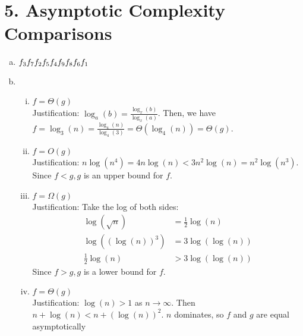 \documentclass[a4paper]{article}
\newcommand{\f}[1]{\text{#1}}
\newcommand{\<}{\langle}
\renewcommand{\>}{\rangle}
\renewcommand{\^}{\wedge}
\begin{document}
\section{5. Asymptotic Complexity Comparisons}
\begin{enumerate} [a)]
    \item $f_3\\f_7\\f_2\\f_5\\f_4\\f_9\\f_8\\f_6\\f_1$
    \item
        \begin{enumerate}[i)]
            \item $f = \Theta(g)$\\
            Justification: $\log_a(b) = \frac{\log_x(b)}{\log_x(a)}$. Then, we have $f = \log_3(n) = \frac{\log_4(n)}{\log_4(3)} = \Theta(\log_4(n)) = \Theta(g)$.
            \item $f = O(g)$\\
            Justification: $n\log(n^4) = 4n\log(n) < 3n^2\log(n) = n^2\log(n^3)$. Since $f < g, g$ is an upper bound for $f$.
            \item $f = \Omega(g)$\\
            Justification: Take the log of both sides:
            \begin{align*}
                \log(\sqrt{n}) &= \frac{1}{2}\log(n)\\
                \log((\log(n))^3) &= 3\log(\log(n))\\
                \frac{1}{2}\log(n) &> 3\log(\log(n))
            \end{align*}
            Since $f > g, g$ is a lower bound for $f$.
            \item $f = \Theta(g)$\\
            Justification: $\log(n) > 1$ as $n \to \infty$. Then $n + \log(n) < n + (\log(n))^2$. $n$ dominates, so $f$ and $g$ are equal asymptotically
        \end{enumerate}
\end{enumerate}
\newpage
\end{document}

